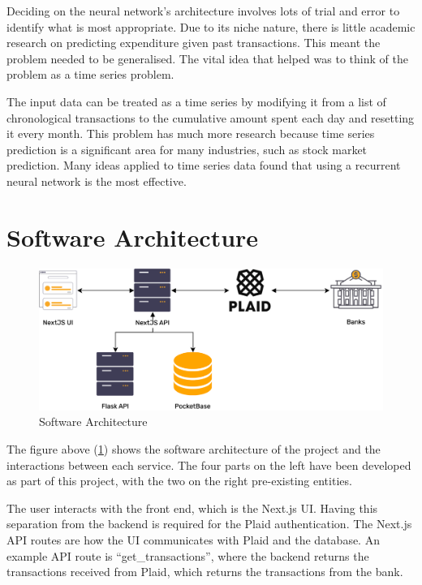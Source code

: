 Deciding on the neural network's architecture involves lots of trial and error to identify what is most appropriate. Due to its niche nature, there is little academic research on predicting expenditure given past transactions. This meant the problem needed to be generalised. The vital idea that helped was to think of the problem as a time series problem.

The input data can be treated as a time series by modifying it from a list of chronological transactions to the cumulative amount spent each day and resetting it every month. This problem has much more research because time series prediction is a significant area for many industries, such as stock market prediction. Many ideas applied to time series data found that using a recurrent neural network is the most effective.
\section{Software Architecture}

\begin{figure}[H]
	\centering
	\includegraphics[width=\textwidth]{images/software_architecture.png}
	\caption{Software Architecture}
	\label{fig:SoftwareArchitecture}
\end{figure}

The figure above (\ref{fig:SoftwareArchitecture}) shows the software architecture of the project and the interactions between each service. The four parts on the left have been developed as part of this project, with the two on the right pre-existing entities.

The user interacts with the front end, which is the Next.js UI. Having this separation from the backend is required for the Plaid authentication. The Next.js API routes are how the UI communicates with Plaid and the database. An example API route is ``get\_transactions'', where the backend returns the transactions received from Plaid, which returns the transactions from the bank.

